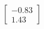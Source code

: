 \documentclass[preview]{standalone}
\begin{document}
\begin{align*}
\begin{bmatrix} -0.83 \\ 1.43 \end{bmatrix}
\end{align*}
\end{document}

